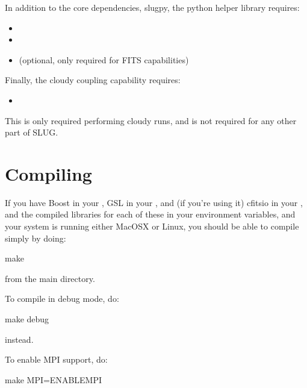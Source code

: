 \documentclass[letterpaper,10pt,english]{sphinxmanual}
\begin{document}
In addition to the core dependencies, slugpy, the python helper library requires:
\begin{itemize}
\item {} 

\item {} 

\item {} 
 (optional, only required for FITS capabilities)

\end{itemize}

Finally, the cloudy coupling capability requires:
\begin{itemize}
\item {} 

\end{itemize}

This is only required performing cloudy runs, and is not required for any other part of SLUG.


\section{Compiling}
\label{\detokenize{compiling:compiling}}\label{\detokenize{compiling:ssec-compiling}}
If you have Boost in your , GSL in your , and (if you’re using it) cfitsio in your , and the compiled libraries for each of these in your  environment variables, and your system is running either MacOSX or Linux, you should be able to compile simply by doing:

\begin{sphinxVerbatim}[commandchars=\\\{\}]
make
\end{sphinxVerbatim}

from the main  directory.

To compile in debug mode, do:

\begin{sphinxVerbatim}[commandchars=\\\{\}]
make debug
\end{sphinxVerbatim}

instead.

To enable MPI support, do:

\begin{sphinxVerbatim}[commandchars=\\\{\}]
make MPI=ENABLE\PYGZus{}MPI
\end{sphinxVerbatim}
\end{document}
